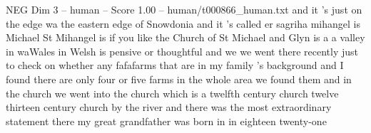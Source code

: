 \begin{textsample}{NEG Dim 3 – human – Score 1.00 – human/t000866\_human.txt}  \label{ex:f3_neg_039}
and it 's just on the edge wa the eastern edge of Snowdonia and it 's called er sagriha mihangel is Michael St Mihangel is if you like the Church of St Michael and Glyn is a a valley in waWales in Welsh is pensive or thoughtful and we we went there recently just to check on whether any fafafarms that are in my family 's background and I found there are only four or five farms in the whole area we found them and in the church we went into the church which is a twelfth century church twelve thirteen century church by the river and there was the most extraordinary statement there my great grandfather was born in in eighteen twenty-one

\end{textsample}
